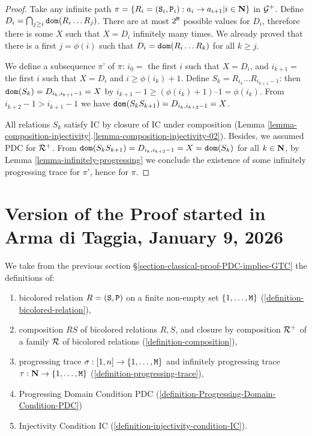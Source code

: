 \documentclass{lmcs}
\begin{document}
\begin{proof}
Take any infinite path $\pi = \{R_i = ({\tt S}_i,{\tt P}_i) : a_i \rightarrow a_{i+1} | i \in {\bf N}\}$ 
in ${\mathcal G}^+$. Define $D_i = \bigcap_{j \ge i} {\tt dom}(R_i \ldots R_j)$. 
There are at most $2^{{\tt M}}$ 
possible values for $D_i$, therefore there is some $X$ such that $X=D_i$ infinitely many 
times. We already proved that there is a first $j = \phi(i)$ such that $D_i = {\tt dom}(R_i \ldots R_k)
$ for all $k \ge j$.

We define a subsequence $\pi’$ of $\pi$: $i_0 =$ the first $i$ such that $X = D_i$, and $i_{k+1} =$ the first $i$ such that $X= D_i$ and $i  \ge \phi(i_k) + 1$. Define $S_k = R_{i_k} \ldots R_{i_{k+1}-1}$: then ${\tt dom}(S_k) = D_{i_k, i_{k+1}-1} = X$ by $i_{k+1} -1 \ge (\phi(i_k) + 1) – 1 = \phi(i_k)$. From $ i_{k+2}-1 > i_{k+1}-1$ we have ${\tt dom}(S_k S_{k+1}) = D_{i_k, i_{k+2}-1} = X$. 

All relations $S_k$ satisfy IC by closure of IC under composition (Lemma \ref{lemma-composition-injectivity}.\ref{lemma-composition-injectivity-02}). Besides, we assumed PDC for ${\mathcal R}^+$. 
From ${\tt dom}(S_k S_{k+1}) = D_{i_k, i_{k+2}-1} = X = {\tt dom}(S_k)$ for all $k \in {\bf N}$, 
by Lemma \ref{lemma-infinitely-progressing} we conclude the existence of some infinitely progressing trace for $\pi’$, hence for $\pi$.
\end{proof}

\newpage


\section{Version of the Proof started in Arma di Taggia, January 9, 2026}
We take from the previous section \S \ref{section-classical-proof-PDC-implies-GTC} 
the definitions of: 
\begin{enumerate}
\item
bicolored relation $R = ({\tt S}, {\tt P})$ on a finite non-empty set 
$\{1, \ldots, {\tt M}\}$  (\ref{definition-bicolored-relation}), 
\item
composition $RS$ of bicolored relations $R,S$, and closure by composition ${\mathcal R}^+$ 
of a family ${\mathcal R}$ of bicolored relations (\ref{definition-composition}),
\item
progressing trace $\sigma:[1,n] \rightarrow \{1,\ldots,{\tt M}\}$
and infinitely progressing trace
$\tau:{\bf N} \rightarrow  \{1,\ldots,{\tt M}\}$ (\ref{definition-progressing-trace}),
\item
Progressing Domain Condition PDC (\ref{definition-Progressing-Domain-Condition-PDC})
\item
Injectivity Condition IC (\ref{definition-injectivity-condition-IC}).
\end{enumerate}
\end{document}
